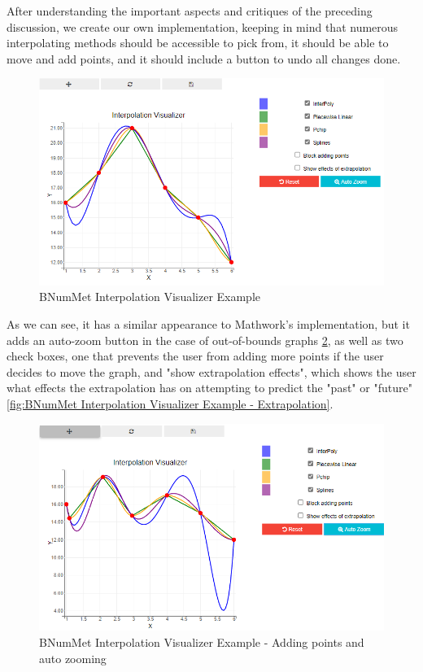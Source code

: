 After understanding the important aspects and critiques of the preceding discussion, we create our own implementation, keeping in mind that numerous interpolating methods should be accessible to pick from, it should be able to move and add points, and it should include a button to undo all changes done.
\begin{figure}[H]
    \centering
    \includegraphics[width=\textwidth]{Include/Images/Thesis/Development/Visualizers/INTERPOLATION VISUALIZER/BNumMet.Interpolation.Ex1.png}
    \caption{BNumMet Interpolation Visualizer Example}
    \label{fig:BNumMet Interpolation Visualizer Example}
\end{figure}
As we can see, it has a similar appearance to Mathwork's implementation, but it adds an auto-zoom button in the case of out-of-bounds graphs \ref{fig:BNumMet Interpolation Visualizer Example - Adding points and auto zooming}, as well as two check boxes, one that prevents the user from adding more points if the user decides to move the graph, and "show extrapolation effects", which shows the user what effects the extrapolation has on attempting to predict the "past" or "future"  \ref{fig:BNumMet Interpolation Visualizer Example - Extrapolation}. 
\begin{figure}[H]
    \centering
    \includegraphics[width=\textwidth]{Include/Images/Thesis/Development/Visualizers/INTERPOLATION VISUALIZER/BNumMet.Interpolation.Ex1.1.png}
    \caption{BNumMet Interpolation Visualizer Example - Adding points and auto zooming}
    \label{fig:BNumMet Interpolation Visualizer Example - Adding points and auto zooming}
\end{figure}
